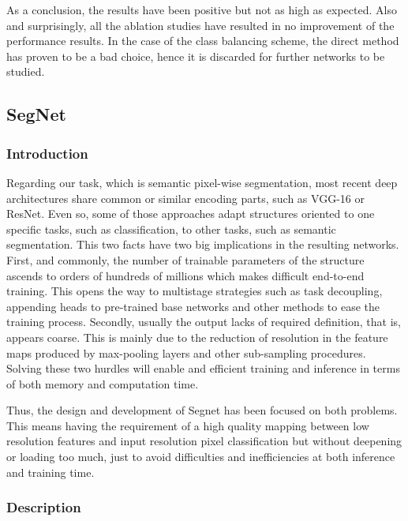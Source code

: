 As a conclusion, the results have been positive but not as high as expected. Also and surprisingly, all the ablation studies have resulted in no improvement of the performance results. In the case of the class balancing scheme, the direct method has proven to be a bad choice, hence it is discarded for further networks to be studied.\newline

\subsection{SegNet}

\subsubsection{Introduction}

Regarding our task, which is semantic pixel-wise segmentation, most recent deep architectures share common or similar encoding parts, such as VGG-16 or ResNet. Even so, some of those approaches adapt structures oriented to one specific tasks, such as classification, to other tasks, such as semantic segmentation. This two facts have two big implications in the resulting networks. First, and commonly, the number of trainable parameters of the structure ascends to orders of hundreds of millions which makes difficult end-to-end training. This opens the way to multistage strategies such as task decoupling, appending heads to pre-trained base networks and other methods to ease the training process. Secondly, usually the output lacks of required definition, that is, appears coarse. This is mainly due to the reduction of resolution in the feature maps produced by max-pooling layers and other sub-sampling procedures. Solving these two hurdles will enable and efficient training and inference in terms of both memory and computation time. \newline

Thus, the design and development of Segnet has been focused on both problems. This means having the requirement of a high quality mapping between low resolution features and  input resolution pixel classification but without deepening or loading too much, just to avoid difficulties and inefficiencies at both inference and training time. 

\subsubsection{Description}

